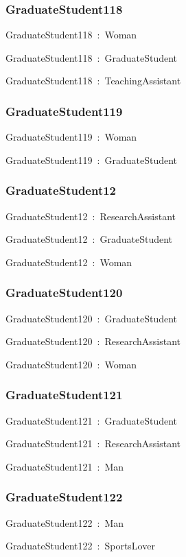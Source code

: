 \documentclass{article}
\begin{document}
\subsubsection*{GraduateStudent118}

GraduateStudent118~:~Woman

GraduateStudent118~:~GraduateStudent

GraduateStudent118~:~TeachingAssistant

\subsubsection*{GraduateStudent119}

GraduateStudent119~:~Woman

GraduateStudent119~:~GraduateStudent

\subsubsection*{GraduateStudent12}

GraduateStudent12~:~ResearchAssistant

GraduateStudent12~:~GraduateStudent

GraduateStudent12~:~Woman

\subsubsection*{GraduateStudent120}

GraduateStudent120~:~GraduateStudent

GraduateStudent120~:~ResearchAssistant

GraduateStudent120~:~Woman

\subsubsection*{GraduateStudent121}

GraduateStudent121~:~GraduateStudent

GraduateStudent121~:~ResearchAssistant

GraduateStudent121~:~Man

\subsubsection*{GraduateStudent122}

GraduateStudent122~:~Man

GraduateStudent122~:~SportsLover
\end{document}
